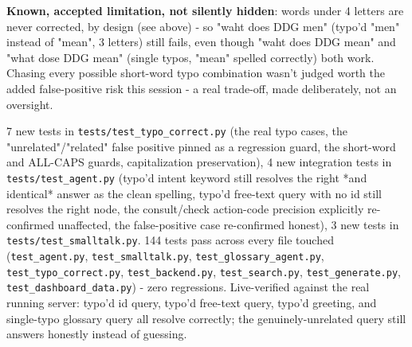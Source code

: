 \textbf{Known, accepted limitation, not silently hidden}: words under 4 letters are never corrected, by design (see above) - so "waht does DDG men" (typo'd "men" instead of "mean", 3 letters) still fails, even though "waht does DDG mean" and "what dose DDG mean" (single typos, "mean" spelled correctly) both work. Chasing every possible short-word typo combination wasn't judged worth the added false-positive risk this session - a real trade-off, made deliberately, not an oversight.

7 new tests in \texttt{tests/\allowbreak{}test\_\allowbreak{}typo\_\allowbreak{}correct.py} (the real typo cases, the "unrelated"/"related" false positive pinned as a regression guard, the short-word and ALL-CAPS guards, capitalization preservation), 4 new integration tests in \texttt{tests/\allowbreak{}test\_\allowbreak{}agent.py} (typo'd intent keyword still resolves the right *and identical* answer as the clean spelling, typo'd free-text query with no id still resolves the right node, the consult/check action-code precision explicitly re-confirmed unaffected, the false-positive case re-confirmed honest), 3 new tests in \texttt{tests/\allowbreak{}test\_\allowbreak{}smalltalk.py}. 144 tests pass across every file touched (\texttt{test\_\allowbreak{}agent.py}, \texttt{test\_\allowbreak{}smalltalk.py}, \texttt{test\_\allowbreak{}glossary\_\allowbreak{}agent.py}, \texttt{test\_\allowbreak{}typo\_\allowbreak{}correct.py}, \texttt{test\_\allowbreak{}backend.py}, \texttt{test\_\allowbreak{}search.py}, \texttt{test\_\allowbreak{}generate.py}, \texttt{test\_\allowbreak{}dashboard\_\allowbreak{}data.py}) - zero regressions. Live-verified against the real running server: typo'd id query, typo'd free-text query, typo'd greeting, and single-typo glossary query all resolve correctly; the genuinely-unrelated query still answers honestly instead of guessing.

